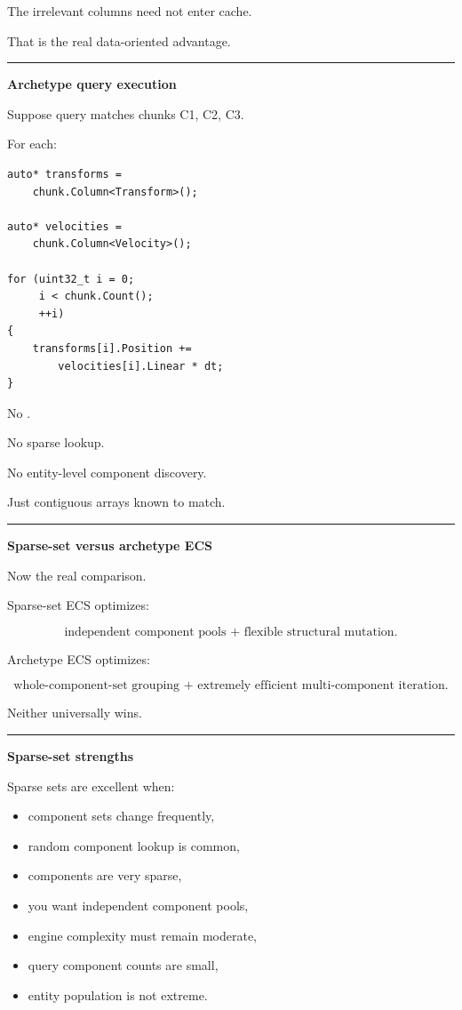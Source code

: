 The irrelevant columns need not enter cache.

That is the real data-oriented advantage.

\begin{center}\rule{0.5\linewidth}{0.5pt}\end{center}

\textbf{Archetype query execution}

Suppose query matches chunks C1, C2, C3.

For each:

\begin{verbatim}
auto* transforms =
    chunk.Column<Transform>();

auto* velocities =
    chunk.Column<Velocity>();

for (uint32_t i = 0;
     i < chunk.Count();
     ++i)
{
    transforms[i].Position +=
        velocities[i].Linear * dt;
}
\end{verbatim}

No .

No sparse lookup.

No entity-level component discovery.

Just contiguous arrays known to match.

\begin{center}\rule{0.5\linewidth}{0.5pt}\end{center}

\textbf{Sparse-set versus archetype ECS}

Now the real comparison.

Sparse-set ECS optimizes:

\[
\boxed{
\text{independent component pools + flexible structural mutation}.
}
\]

Archetype ECS optimizes:

\[
\boxed{
\text{whole-component-set grouping + extremely efficient multi-component iteration}.
}
\]

Neither universally wins.

\begin{center}\rule{0.5\linewidth}{0.5pt}\end{center}

\textbf{Sparse-set strengths}

Sparse sets are excellent when:

\begin{itemize}
\tightlist
\item
  component sets change frequently,
\item
  random component lookup is common,
\item
  components are very sparse,
\item
  you want independent component pools,
\item
  engine complexity must remain moderate,
\item
  query component counts are small,
\item
  entity population is not extreme.
\end{itemize}

